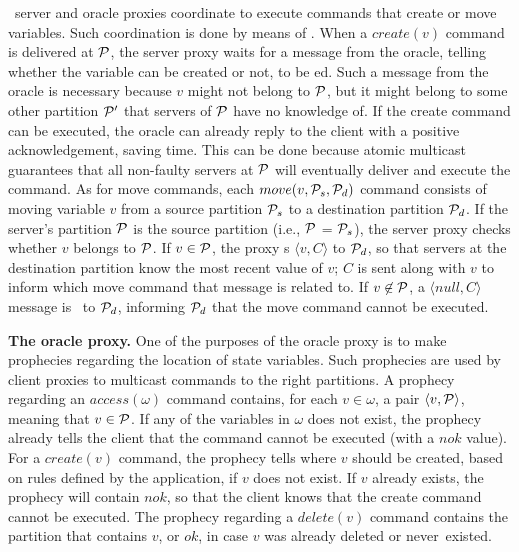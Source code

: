 \dssmr\ server and oracle proxies coordinate to execute commands that create or move variables.
Such coordination is done by means of \rmcast{}.
When a $create(v)$ command is delivered at $\mathcal{P}$, the server proxy waits for a message from the oracle, telling whether the variable can be created or not, to be \rmdel{}ed.
Such a message from the oracle is necessary because $v$ might not belong to $\mathcal{P}$, but it might belong to some other partition $\mathcal{P}'$ that servers of $\mathcal{P}$ have no knowledge of.
If the create command can be executed, the oracle can already reply to the client with a positive acknowledgement, saving time.
This can be done because atomic multicast guarantees that all non-faulty servers at $\mathcal{P}$ will eventually deliver and execute the command.
As for move commands, each $move(v,\mathcal{P}_s,\mathcal{P}_d)$ command consists of moving variable $v$ from a source partition $\mathcal{P}_s$ to a destination partition $\mathcal{P}_d$.
If the server's partition $\mathcal{P}$ is the source partition (i.e., $\mathcal{P}$ = $\mathcal{P}_s$), the server proxy checks whether $v$ belongs to $\mathcal{P}$.
If $v \in \mathcal{P}$, the proxy \rmcast{}s $\langle v, C \rangle$ to $\mathcal{P}_d$, so that servers at the destination partition know the most recent value of $v$; $C$ is sent along with $v$ to inform which move command that message is related to.
If $v \not\in \mathcal{P}$, a $\langle null, C \rangle$ message is \rmcast\ to $\mathcal{P}_d$, informing $\mathcal{P}_d$ that the move command cannot be executed.



\textbf{The oracle proxy.} One of the purposes of the oracle proxy is to make prophecies regarding the location of state variables.
Such prophecies are used by client proxies to multicast commands to the right partitions.
A prophecy regarding an $access(\omega)$ command contains, for each $v \in \omega$, a pair $\langle v, \mathcal{P} \rangle$, meaning that $v \in \mathcal{P}$.
If any of the variables in $\omega$ does not exist, the prophecy already tells the client that the command cannot be executed (with a $nok$ value).
For a $create(v)$ command, the prophecy tells where $v$ should be created, based on rules defined by the application, if $v$ does not exist.
If $v$ already exists, the prophecy will contain $nok$, so that the client knows that the create command cannot be executed.
The prophecy regarding a $delete(v)$ command contains the partition that contains $v$, or $ok$, in case $v$ was already deleted or never~existed.

